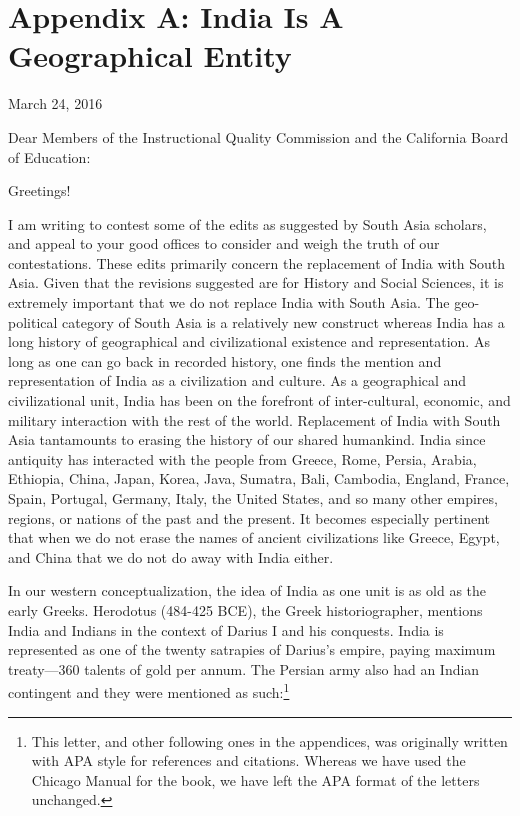 \chapter{Appendix A: India Is A Geographical Entity}

March 24, 2016

Dear Members of the Instructional Quality Commission and the California Board of Education:

Greetings!

I am writing to contest some of the edits as suggested by South Asia scholars, and appeal to your good offices to consider and weigh the truth of our contestations. These edits primarily concern the replacement of India with South Asia. Given that the revisions suggested are for History and Social Sciences, it is extremely important that we do not replace India with South Asia. The geo-political category of South Asia is a relatively new construct whereas India has a long history of geographical and civilizational existence and representation. As long as one can go back in recorded history, one finds the mention and representation of India as a civilization and culture. As a geographical and civilizational unit, India has been on the forefront of inter-cultural, economic, and military interaction with the rest of the world. Replacement of India with South Asia tantamounts to erasing the history of our shared humankind. India since antiquity has interacted with the people from Greece, Rome, Persia, Arabia, Ethiopia, China, Japan, Korea, Java, Sumatra, Bali, Cambodia, England, France, Spain, Portugal, Germany, Italy, the United States, and so many other empires, regions, or nations of the past and the present. It becomes especially pertinent that when we do not erase the names of ancient civilizations like Greece, Egypt, and China that we do not do away with India either.

In our western conceptualization, the idea of India as one unit is as old as the early Greeks. Herodotus (484-425 BCE), the Greek historiographer, mentions India and Indians in the context of Darius I and his conquests. India is represented as one of the twenty satrapies of Darius’s empire, paying maximum treaty—360 talents of gold per annum. The Persian army also had an Indian contingent and they were mentioned as such:\footnote{This letter, and other following ones in the appendices, was originally written with APA style for references and citations. Whereas we have used the Chicago Manual for the book, we have left the APA format of the letters unchanged.}


